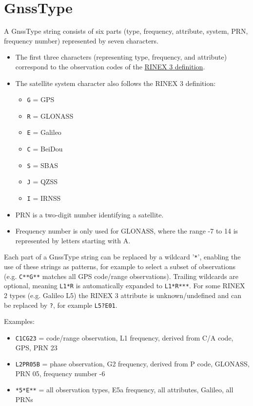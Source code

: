 \clearpage

\section{GnssType}\label{gnssType}
A GnssType string consists of six parts (type, frequency, attribute, system, PRN, frequency number)
represented by seven characters.
\begin{itemize}
\item The first three characters (representing type, frequency, and attribute) correspond to the observation codes of the
      \href{https://files.igs.org/pub/data/format/rinex305.pdf}{RINEX 3 definition}.
\item The satellite system character also follows the RINEX 3 definition:
      \begin{itemize}
        \item \verb|G| = GPS
        \item \verb|R| = GLONASS
        \item \verb|E| = Galileo
        \item \verb|C| = BeiDou
        \item \verb|S| = SBAS
        \item \verb|J| = QZSS
        \item \verb|I| = IRNSS
      \end{itemize}
\item PRN is a two-digit number identifying a satellite.
\item Frequency number is only used for GLONASS, where the range -7 to 14 is represented by letters starting with A.
\end{itemize}

Each part of a GnssType string can be replaced by a wildcard '\verb|*|', enabling the use of these strings as patterns,
for example to select a subset of observations (e.g. \verb|C**G**| matches all GPS code/range observations).
Trailing wildcards are optional, meaning \verb|L1*R| is automatically expanded to \verb|L1*R***|.
For some RINEX 2 types (e.g. Galileo L5) the RINEX 3 attribute is unknown/undefined and can be replaced by \verb|?|,
for example \verb|L5?E01|.

Examples:
\begin{itemize}
\item \verb|C1CG23| = code/range observation, L1 frequency, derived from C/A code, GPS, PRN 23
\item \verb|L2PR05B| = phase observation, G2 frequency, derived from P code, GLONASS, PRN 05, frequency number -6
\item \verb|*5*E**| = all observation types, E5a frequency, all attributes, Galileo, all PRNs
\end{itemize}

